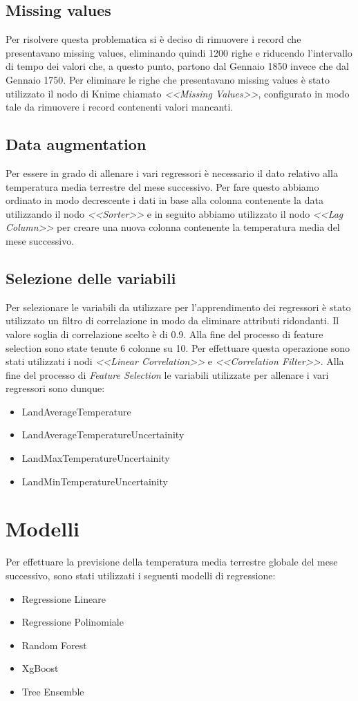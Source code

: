 \documentclass[12pt, a4paper, twocolumn]{article} %
\begin{document}
\subsection{Missing values}
Per risolvere questa problematica si è deciso di rimuovere i record che presentavano missing values, eliminando quindi 1200 righe e riducendo l'intervallo di tempo dei valori che, a questo punto, partono dal Gennaio 1850 invece che dal Gennaio 1750. Per eliminare le righe che presentavano missing values è stato utilizzato il nodo di Knime chiamato \textit{<<Missing Values>>}, configurato in modo tale da rimuovere i record contenenti valori mancanti.

\subsection{Data augmentation}
Per essere in grado di allenare i vari regressori è necessario il dato relativo alla temperatura media terrestre del mese successivo. Per fare questo abbiamo ordinato in modo decrescente i dati in base alla colonna contenente la data utilizzando il nodo \textit{<<Sorter>>} e in seguito abbiamo utilizzato il nodo \textit{<<Lag Column>>} per creare una nuova colonna contenente la temperatura media del mese successivo.

\subsection{Selezione delle variabili}
Per selezionare le variabili da utilizzare per l'apprendimento dei regressori è stato utilizzato un filtro di correlazione in modo da eliminare attributi ridondanti. Il valore soglia di correlazione scelto è di 0.9. Alla fine del processo di feature selection sono state tenute 6 colonne su 10. Per effettuare questa operazione sono stati utilizzati i nodi \textit{<<Linear Correlation>>} e \textit{<<Correlation Filter>>}. Alla fine del processo di \textit{Feature Selection} le variabili utilizzate per allenare i vari regressori sono dunque: 
\begin{itemize}
	\item LandAverageTemperature
	\item LandAverageTemperatureUncertainity
	\item LandMaxTemperatureUncertainity
	\item LandMinTemperatureUncertainity
\end{itemize}

\section{Modelli}
Per effettuare la previsione della temperatura media terrestre globale del mese successivo, sono stati utilizzati i seguenti modelli di regressione:
\begin{itemize}
	\item Regressione Lineare
	\item Regressione Polinomiale
	\item Random Forest
	\item XgBoost
	\item Tree Ensemble
\end{itemize}
\end{document}
